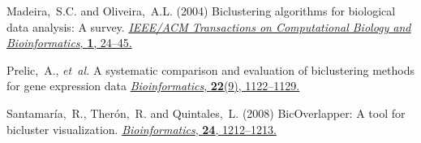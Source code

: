 \documentclass[round]{bioinfo}
\begin{document}
\begin{thebibliography}{6}
Madeira,~S.C. and Oliveira,~A.L. (2004)
Biclustering algorithms for biological data analysis: A survey.
\href{http://dx.doi.org/10.1109/TCBB.2004.2}{\emph{IEEE/ACM Transactions on Computational Biology and Bioinformatics}, {\bf 1}, 24--45.}

Prelic,~A., \emph{et~al.} 
A systematic comparison and evaluation of biclustering methods for gene expression data 
\href{http://dx.doi.org/10.1093/bioinformatics/bt1060}{\emph{Bioinformatics}, {\bf 22}(9), 1122--1129.}

Santamar\'ia,~R., Ther\'on,~R. and Quintales,~L. (2008)
BicOverlapper: A tool for bicluster visualization. 
\href{http://dx.doi.org/10.1093/bioinformatics/btn076}{\emph{Bioinformatics}, {\bf 24}, 1212--1213.}

\end{thebibliography}
\end{document}
